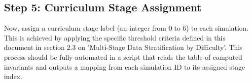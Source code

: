 \subsection{Step 5: Curriculum Stage Assignment}
Now, assign a curriculum stage label (an integer from 0 to 6) to each simulation. 
This is achieved by applying the specific threshold criteria defined in this document in section 2.3 on 'Multi-Stage Data Stratification by Difficulty'. 
This process should be fully automated in a script that reads the table of computed invariants and outputs a mapping from each simulation ID to its assigned stage index.

















